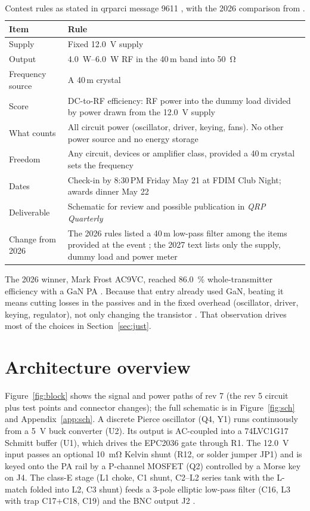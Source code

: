 \documentclass[11pt,letterpaper]{article}
\begin{document}
\begin{table}[h]
\centering\small
\caption{Contest rules as stated in qrparci message 9611 \cite{qrparci9611}, with the 2026 comparison from \cite{fdim2026rules}.}\label{tab:rules}
\begin{tabularx}{\textwidth}{@{}L{3.6cm}Y@{}}
\toprule
Item & Rule \\ \midrule
Supply & Fixed \SI{12.0}{\volt} supply \\
Output & \SIrange{4.0}{6.0}{\watt} RF in the 40\,m band into \SI{50}{\ohm} \\
Frequency source & A 40\,m crystal \\
Score & DC-to-RF efficiency: RF power into the dummy load divided by power drawn from the \SI{12.0}{\volt} supply \\
What counts & All circuit power (oscillator, driver, keying, fans). No other power source and no energy storage \\
Freedom & Any circuit, devices or amplifier class, provided a 40\,m crystal sets the frequency \\
Dates & Check-in by 8:30\,PM Friday May 21 at FDIM Club Night; awards dinner May 22 \\
Deliverable & Schematic for review and possible publication in \emph{QRP Quarterly} \\
Change from 2026 & The 2026 rules listed a 40\,m low-pass filter among the items provided at the event \cite{fdim2026rules}; the 2027 text lists only the supply, dummy load and power meter \\
\bottomrule
\end{tabularx}
\end{table}

The 2026 winner, Mark Frost AC9VC, reached \SI{86.0}{\percent} whole-transmitter efficiency with a GaN PA \cite{fdim2026winner}. Because that entry already used GaN, beating it means cutting losses in the passives and in the fixed overhead (oscillator, driver, keying, regulator), not only changing the transistor \cite{projnotes}. That observation drives most of the choices in Section~\ref{sec:just}.

\section{Architecture overview}\label{sec:arch}

Figure~\ref{fig:block} shows the signal and power paths of rev 7 (the rev 5 circuit plus test points and connector changes); the full schematic is in Figure~\ref{fig:sch} and Appendix~\ref{app:sch}. A discrete Pierce oscillator (Q4, Y1) runs continuously from a \SI{5}{\volt} buck converter (U2). Its output is AC-coupled into a 74LVC1G17 Schmitt buffer (U1), which drives the EPC2036 gate through R1. The \SI{12.0}{\volt} input passes an optional \SI{10}{\milli\ohm} Kelvin shunt (R12, or solder jumper JP1) and is keyed onto the PA rail by a P-channel MOSFET (Q2) controlled by a Morse key on J4. The class-E stage (L1 choke, C1 shunt, C2--L2 series tank with the L-match folded into L2, C3 shunt) feeds a 3-pole elliptic low-pass filter (C16, L3 with trap C17+C18, C19) and the BNC output J2 \cite{projkicad,projnotes}.
\end{document}
